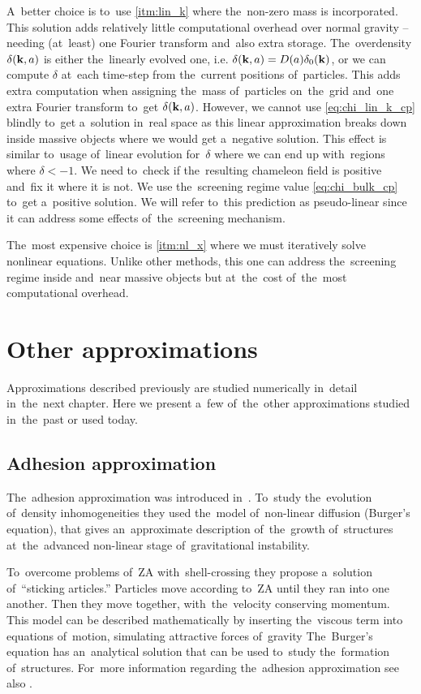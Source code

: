 A~better choice is to~use \ref{itm:lin_k} where the~non-zero mass is incorporated. This solution adds relatively little computational overhead over normal gravity -- needing (at~least) one Fourier transform and~also extra storage. The~overdensity $\delta(\mathbf k, a)$ is either the~linearly evolved one, i.e. $\delta(\mathbf k, a) = D(a)\delta_0(\mathbf k)$, or we can compute $\delta$ at~each time-step from the~current positions of~particles. This adds extra computation when assigning the~mass of~particles on~the~grid and~one extra Fourier transform to~get $\delta(\mathbf k, a)$. 
However, we cannot use \eqref{eq:chi_lin_k_cp} blindly to~get a~solution in~real space as this linear approximation breaks down inside massive objects where we would get a~negative solution. This effect is similar to~usage of~linear evolution for~$\delta$ where we can end up with~regions where $\delta<-1$. We need to~check if the~resulting chameleon field is positive and~fix it where it is not. We use the~screening regime value \eqref{eq:chi_bulk_cp} to~get a~positive solution. We will refer to~this prediction as pseudo-linear since it can address some effects of~the~screening mechanism.

The~most expensive choice is \ref{itm:nl_x} where we must iteratively solve nonlinear equations. Unlike other methods, this one can address the~screening regime inside and~near massive objects but at~the~cost of~the~most computational overhead.

\section{Other approximations}
Approximations described previously are studied numerically in~detail in~the~next chapter. Here we present a~few of~the~other approximations studied in~the~past or used today.

\subsection{Adhesion approximation}
The~adhesion approximation was introduced in~\textcite{1989MNRAS.236..385G}. To~study the~evolution of~density inhomogeneities they used the~model of~non-linear diffusion (Burger's equation), that gives an~approximate description of~the~growth of~structures at~the~advanced non-linear stage of~gravitational instability.

To~overcome problems of~ZA with~shell-crossing they propose a~solution of~``sticking articles.'' Particles move according to~ZA until they ran into one another. Then they move together, with~the~velocity conserving momentum. This model can be described mathematically by inserting the~viscous term into equations of~motion, simulating attractive forces of~gravity
The~Burger's equation has an~analytical solution that can be used to~study the~formation of~structures. For~more information regarding the~adhesion approximation see  also \textcite{1990MNRAS.247..260W,1994ApJ...428...28M}.

